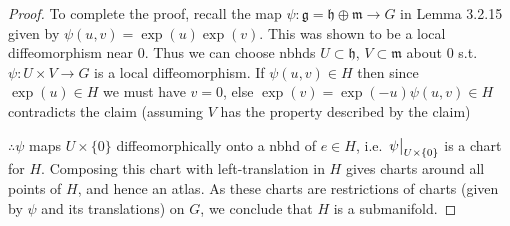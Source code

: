\documentclass[12pt,a4paper]{article}
\newcommand{\lalg}{\ensuremath{\mathfrak{g}}}
\newcommand{\lall}[1]{\ensuremath{\mathfrak{#1}}}
\begin{document}
\begin{proof}
To complete the proof, recall the map $\psi:\lalg = \lall{h}\oplus \lall{m}\to G$ in Lemma 3.2.15 given by $\psi(u,v)=\exp(u)\exp(v)$. This was shown to be a local diffeomorphism near $0$. Thus we can choose nbhds $U\subset \lall{h}$, $V\subset \lall{m}$ about $0$ s.t. $\psi:U\times V\to G$ is a local diffeomorphism. If $\psi(u,v)\in H$ then since $\exp(u)\in H$ we must have $v=0$, else $\exp(v)=\exp(-u)\psi(u,v)\in H$ contradicts the claim (assuming $V$ has the property described by the claim)

$\therefore \psi$ maps $U\times \{0\}$ diffeomorphically onto a nbhd of $e\in H$, i.e. $\eval{\psi}_{U\times \{0\}}$ is a chart for $H$. Composing this chart with left-translation in $H$ gives charts around all points of $H$, and hence an atlas. As these charts are restrictions of charts (given by $\psi$ and its translations) on $G$, we conclude that $H$ is a submanifold.
\end{proof}
\end{document}
